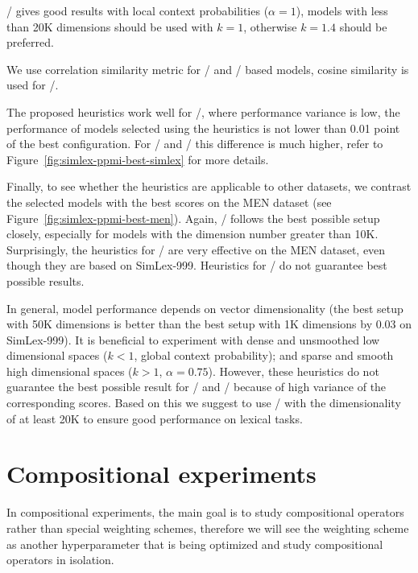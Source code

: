 \documentclass[11pt,letterpaper]{article}
\begin{document}
\NSPMI/ gives good results with local context probabilities ($\alpha = 1$), models with less than 20K dimensions should be used with $k = 1$, otherwise $k = 1.4$ should be preferred.

We use correlation similarity metric for \SPMI/ and \NSPMI/ based models, cosine similarity is used for \logNSPMI/.

The proposed heuristics work well for \logNSPMI/, where performance variance is low, the performance of models selected using the heuristics is not lower than 0.01 point of the best configuration. For \SPMI/ and \NSPMI/ this difference is much higher, refer to Figure~\ref{fig:simlex-ppmi-best-simlex} for more details.

Finally, to see whether the heuristics are applicable to other datasets, we contrast the selected models with the best scores on the MEN dataset (see Figure~\ref{fig:simlex-ppmi-best-men}). Again, \logNSPMI/ follows the best possible setup closely, especially for models with the dimension number greater than 10K. Surprisingly, the heuristics for \NSPMI/ are very effective on the MEN dataset, even though they are based on SimLex-999. Heuristics for \SPMI/ do not guarantee best possible results.

In general, model performance depends on vector dimensionality (the best setup with 50K dimensions is better than the best setup with 1K dimensions by 0.03 on SimLex-999). It is beneficial to experiment with dense and unsmoothed low dimensional spaces ($k < 1$, global context probability); and sparse and smooth high dimensional spaces ($k > 1$, $\alpha = 0.75$). However, these heuristics do not guarantee the best possible result for \SPMI/ and \NSPMI/ because of high variance of the corresponding scores. Based on this we suggest to use \logNSPMI/ with the dimensionality of at least 20K to ensure good performance on lexical tasks.



\section{Compositional experiments}
\label{sec:compositional-experiments}



In compositional experiments, the main goal is to study compositional operators rather than special weighting schemes, therefore we will see the weighting scheme as another hyperparameter that is being optimized and study compositional operators in isolation.
\end{document}
